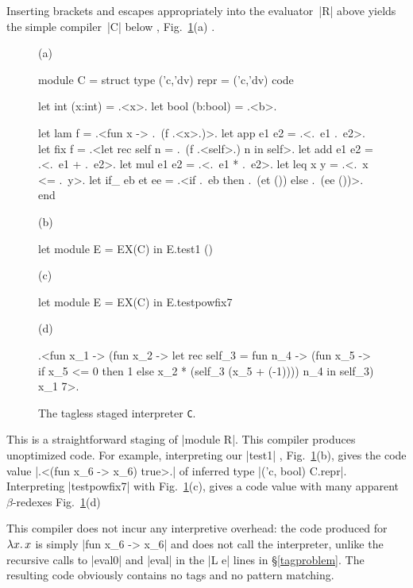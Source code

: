Inserting brackets and escapes appropriately into the
evaluator~|R| above yields the simple compiler~|C| below%
, Fig.~\ref{fig:interpreter-C}(a)
.
%
\begin{figure}[t]
%
(a)\vspace{-10pt}
\begin{code}
module C = struct
  type ('c,'dv) repr = ('c,'dv) code

  let int (x:int)   = .<x>.
  let bool (b:bool) = .<b>.

  let lam f         = .<fun x -> .~(f .<x>.)>.
  let app e1 e2     = .<.~e1 .~e2>.
  let fix f =  .<let rec self n = .~(f .<self>.) n in self>.
  let add e1 e2     = .<.~e1 + .~e2>.
  let mul e1 e2     = .<.~e1 * .~e2>.
  let leq x y       = .<.~x <= .~y>.
  let if_ eb et ee  = .<if .~eb then .~(et ()) else .~(ee ())>.
end
\end{code}
%
(b)\vspace{-10pt}
\begin{code}
let module E = EX(C) in E.test1 ()
\end{code}
%
(c)\vspace{-10pt}
\begin{code}
let module E = EX(C) in E.testpowfix7
\end{code}
%
(d)\vspace{-10pt}
\begin{code}
.<fun x_1 -> (fun x_2 ->
  let rec self_3 = fun n_4 ->
   (fun x_5 -> if x_5 <= 0 then 1  else x_2 * (self_3 (x_5 + (-1))))
   n_4 in self_3) x_1 7>.
\end{code}
%
\caption{The tagless staged interpreter \texttt{C}.}
\label{fig:interpreter-C}
\end{figure}
%
This is a straightforward staging of
|module R|.
This compiler produces
unoptimized code. For example, interpreting our |test1|%
, Fig.~\ref{fig:interpreter-C}(b),
gives the code value |.<(fun x_6 -> x_6) true>.|
of inferred type |('c, bool) C.repr|.  Interpreting |testpowfix7|
with
Fig.~\ref{fig:interpreter-C}(c),
gives a code value with many apparent $\beta$-redexes
Fig.~\ref{fig:interpreter-C}(d)

This compiler does not incur
any interpretive overhead: the
code produced for $\mathopen{\lambda\mathord{x}.\,}x$ is simply |fun x_6 -> x_6| and does not
  call the interpreter, unlike the recursive calls to |eval0| and
  |eval| in the |L e| lines in \S\ref{tagproblem}.
The resulting code obviously contains no tags and no pattern matching.

